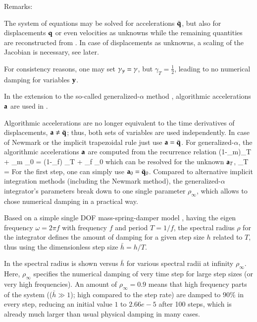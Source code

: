 \noindent Remarks:
\bi
  \item The system of equations may be solved for accelerations $\ddot {\mathbf{q}}$, but also for displacements $\mathbf{q}$ or even velocities as unknowns while the remaining quantities are reconstructed from . In case of displacements as unknowns, a scaling of the Jacobian is necessary, see later.
  \item For consistency reasons, one may set $\gamma_y = \gamma$, but  $\gamma_T = \frac 1 2$, leading to no numerical damping for  variables $\mathbf{y}$.
  \item In the extension to the so-called generalized-$\alpha$ method \cite{Chung1993}, algorithmic accelerations $\mathbf{a}$ are used in . 
  \item Algorithmic accelerations are no longer equivalent to the time derivatives of displacements, $\mathbf{a} \neq \ddot {\mathbf{q}}$; thus, both sets of variables are used independently. In case of Newmark or the implicit trapezoidal rule just use $\mathbf{a} = \ddot {\mathbf{q}}$.
\ei
%
For generalized-$\alpha$, the algorithmic accelerations $\mathbf{a}$ are computed from the recurrence relation
\be
   (1-\alpha_m)\av_T + \alpha_m \av_0 = (1-\alpha_f) \ddot \uv_T + \alpha_f \ddot \uv_0
\ee
which can be resolved for the unknown $\mathbf{a}_T$,
\be
  \av_T = 
\ee
For the first step, one can simply use $\mathbf{a}_0 = \ddot {\mathbf{q}}_0$.
%
Compared to alternative implicit integration methods (including the Newmark method), the generalized-$\alpha$ integrator's parameters break down to one single parameter $\rho_\infty$, which allows to chose numerical damping in a practical way.

Based on a simple single DOF mass-spring-damper model \cite{Bauchau2011}, having the eigen frequency $\omega = 2\pi f$ with frequency $f$ and period $T=1/f$, the spectral radius $\rho$ for the integrator defines the amount of damping for a given step size $h$ related to $T$, thus using the dimensionless step size $\bar h=h/T$.

In  the spectral radius is shown versus $\bar h$ for various spectral radii at infinity $\rho_\infty$. 
Here, $\rho_\infty$ specifies the numerical damping of very time step for large step sizes (or very high frequencies). An amount of $\rho_\infty=0.9$ means that high frequency parts of the system (($\bar h \gg 1$); high compared to the step rate) are damped to $90\%$ in every step, reducing an initial value $1$ to $2.66e-5$ after 100 steps, which is already much larger than usual physical damping in many cases.

